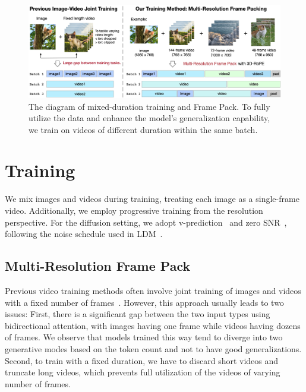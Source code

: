 \begin{figure}[ht]
\begin{center}
\includegraphics[width=\linewidth]{images/CogVideoX-framepacking-2.jpg}
\end{center}
\caption{
The diagram of mixed-duration training and Frame Pack. To fully utilize the data and enhance the model's generalization capability, we train on videos of different duration within the same batch.}
\label{fig:framepack}
\vspace{-5mm}
\end{figure}

\section{Training \model}

We mix images and videos during training, treating each image as a single-frame video. 
Additionally, we employ progressive training from the resolution perspective. 
For the diffusion setting, we adopt v-prediction~\citep{salimans2022progressive} and zero SNR~\citep{lin2024common}, following the noise schedule used in LDM~\citep{rombach2022high}.

\subsection{Multi-Resolution Frame Pack}
Previous video training methods often involve joint training of images and videos with a fixed number of frames~\citep{singer2022make, blattmann2023stable}. 
However, this approach usually leads to two issues: 
First, there is a significant gap between the two input types using bidirectional attention, with images having one frame while videos having dozens of frames. 
We observe that models trained this way tend to diverge into two generative modes based on the token count and not to have good generalizations. %
Second, to train with a fixed duration, we have to discard short videos and truncate long videos, which prevents full utilization of the videos of varying number of frames.

